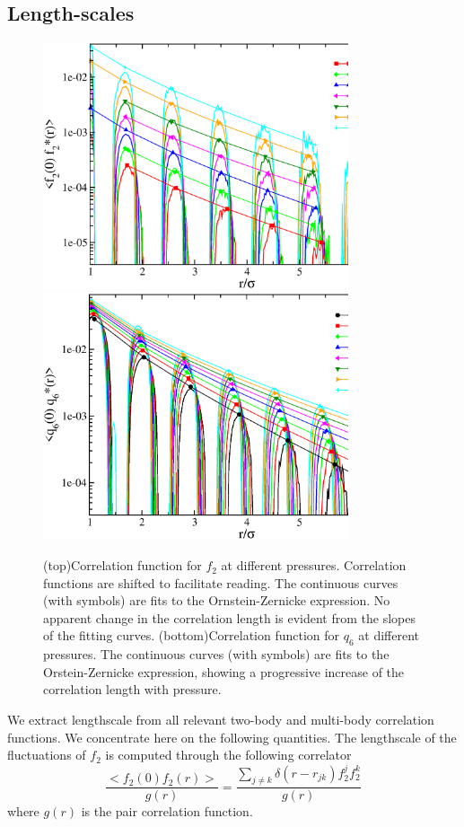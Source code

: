 \documentclass[twocolumn,superscriptaddress]{revtex4-1}
\begin{document}
\subsection{Length-scales}


\begin{figure}
 \centering
 \includegraphics[width=9cm]{./figures/f2_corr.eps}
 \includegraphics[width=9cm]{./figures/q6_vectorcorr.eps}
 \caption{(top)Correlation function for $f_2$ at different pressures. Correlation functions are shifted
to facilitate reading. The continuous curves (with symbols) are fits to the Ornstein-Zernicke expression.
No apparent change in the correlation length is evident from the slopes of the fitting curves.
(bottom)Correlation function for $q_6$ at different pressures. The continuous curves (with symbols) are fits to the Orstein-Zernicke expression,
showing a progressive increase of the correlation length with pressure.}
 \label{fig:corr}
\end{figure}

We extract lengthscale from all relevant two-body and multi-body correlation functions.
We concentrate here on the following quantities.
The lengthscale of the fluctuations of $f_2$
is computed through the following correlator
\begin{equation}
\frac{<f_2(0)f_2(r)>}{g(r)}=\frac{\sum_{j\neq k}\delta(r-r_{jk})f_2^jf_2^k}{g(r)}
\end{equation}
where $g(r)$ is the pair correlation function.
\end{document}
